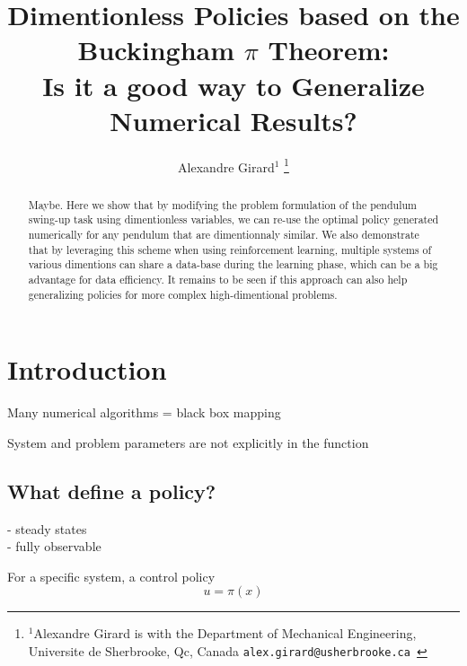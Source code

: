 

\title{\LARGE \bf
Dimentionless Policies based on the Buckingham $\pi$ Theorem: \\ 
Is it a good way to Generalize Numerical Results?
}


\author{Alexandre Girard$^{1}$%
\thanks{$^{1}$Alexandre Girard is with the Department of Mechanical Engineering, Universite de Sherbrooke, Qc, Canada {\tt\small  alex.girard@usherbrooke.ca }}%
}%


\maketitle
\thispagestyle{empty}
\pagestyle{empty}


\begin{abstract}
Maybe. Here we show that by modifying the problem formulation of the pendulum swing-up task using dimentionless variables, we can re-use the optimal policy generated numerically for any pendulum that are dimentionnaly similar. We also demonstrate that by leveraging this scheme when using reinforcement learning, multiple systems of various dimentions can share a data-base during the learning phase, which can be a big advantage for data efficiency. It remains to be seen if this approach can also help generalizing policies for more complex high-dimentional problems.
\end{abstract}

\section{Introduction}

Many numerical algorithms = black box mapping

System and problem parameters are not explicitly in the function




\subsection{What define a policy?}

- steady states \\
- fully observable


For a specific system, a control policy 
\begin{equation}
u
=
\pi \left(
x
\right)
\end{equation}


